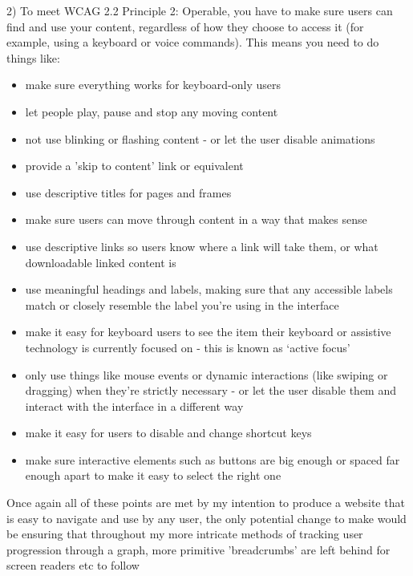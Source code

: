 2)
To meet WCAG 2.2 Principle 2: Operable, you have to make sure users can find and use your content, regardless of how they choose to access it (for example, using a keyboard or voice commands).
This means you need to do things like:
\begin{itemize}
    \item make sure everything works for keyboard-only users
    \item let people play, pause and stop any moving content
    \item not use blinking or flashing content - or let the user disable animations
    \item provide a 'skip to content' link or equivalent
    \item use descriptive titles for pages and frames
    \item make sure users can move through content in a way that makes sense
    \item use descriptive links so users know where a link will take them, or what downloadable linked content is
    \item use meaningful headings and labels, making sure that any accessible labels match or closely resemble the label you're using in the interface
    \item make it easy for keyboard users to see the item their keyboard or assistive technology is currently focused on - this is known as ‘active focus'
    \item only use things like mouse events or dynamic interactions (like swiping or dragging) when they're strictly necessary - or let the user disable them and interact with the interface in a different way
    \item make it easy for users to disable and change shortcut keys
    \item make sure interactive elements such as buttons are big enough or spaced far enough apart to make it easy to select the right one
\end{itemize}
Once again all of these points are met by my intention to produce a website that is easy to navigate and use by any user, the only potential change to make would be ensuring that throughout my more intricate methods of tracking user progression through a graph, more primitive 'breadcrumbs' are left behind for screen readers etc to follow

